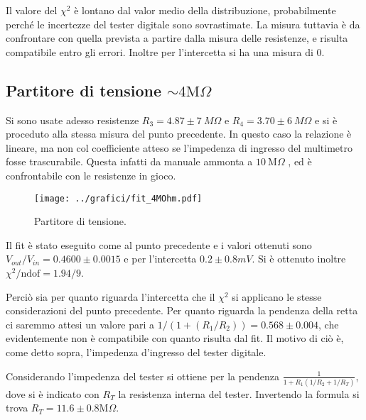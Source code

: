 \documentclass[10pt,a4paper]{article}
\begin{document}
Il valore del $\chi^2$ è lontano dal valor medio della distribuzione, probabilmente perché le incertezze del tester digitale sono sovrastimate. La misura tuttavia è da confrontare con quella prevista a partire dalla misura delle resistenze, e risulta compatibile entro gli errori. Inoltre per l'intercetta si ha una misura di $0$.

\subsection{Partitore di tensione $\sim4\text{M}\Omega$}
Si sono usate adesso resistenze $R_3=4.87 \pm 7 ~M\Omega$ e $R_4=3.70 \pm 6 ~M\Omega$ e si è proceduto alla stessa misura del punto precedente. In questo caso la relazione è lineare, ma non col coefficiente atteso se l'impedenza di ingresso del multimetro fosse trascurabile. Questa infatti da manuale ammonta a $10 ~ \text{M}\Omega$ , ed è confrontabile con le resistenze in gioco.

\begin{figure}[h]
\centering
\begin{minipage}[b]{.6\textwidth}
	\centering
	\texttt{[image: ../grafici/fit\_4MOhm.pdf]}
	\caption{Partitore di tensione.}
	\label{f:par2}
\end{minipage}\hfill
\begin{minipage}[b]{.35\textwidth}
	\centering
	
	\label{...}
\end{minipage}\hspace*{\fill}
\end{figure}

Il fit è stato eseguito come al punto precedente e i valori ottenuti sono $V_{out}/V_{in} = 0.4600 \pm 0.0015$ e per l'intercetta $0.2 \pm 0.8 mV$. Si è ottenuto inoltre $\chi^2 / \text{ndof} = 1.94 / 9$.

Perciò sia per quanto riguarda l'intercetta che il $\chi^2$ si applicano le stesse considerazioni del punto precedente. Per quanto riguarda la pendenza della retta ci saremmo attesi un valore pari a  $1/(1+(R_1/R_2))=0.568 \pm 0.004$, che evidentemente non è compatibile con quanto risulta dal fit. Il motivo di ciò è, come detto sopra, l'impedenza d'ingresso del tester digitale.

Considerando l'impedenza del tester si ottiene per la pendenza $\frac{1}{1 + R_1 (1/R_2 + 1/R_T)}$, dove si è indicato con $R_T$ la resistenza interna del tester. Invertendo la formula si trova $R_T = 11.6 \pm 0.8 \text{M}\Omega$.
\end{document}
